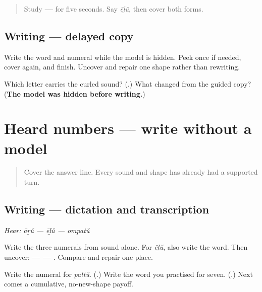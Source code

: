 \label{lesson:ML-W07-numbers-6-10-delayed-copy}



\begin{quote}
Study \textbf{ — } for five seconds. Say \emph{ēḻŭ}, then cover both forms.
\end{quote}

\subsection*{Writing — delayed copy}

Write the word and numeral while the model is hidden. Peek once if needed, cover again, and finish. Uncover and repair one shape rather than rewriting.

\begin{tcolorbox}[breakable,colback=teal!4,colframe=teal!35!black,title={Before you move on}]
Which letter carries the curled sound? (\textbf{}.) What changed from the guided copy? (\textbf{The model was hidden before writing.})
\end{tcolorbox}
\section[\texorpdfstring{\ml{ഏഴ്} \ml{൭} (ēḻŭ, seven)}{ഏഴ് ൭ (ēḻŭ, seven)}]{Heard numbers — write without a model}

\label{lesson:ML-W07-numbers-6-10-dictation}



\begin{quote}
Cover the answer line. Every sound and shape has already had a supported turn.
\end{quote}

\subsection*{Writing — dictation and transcription}
\emph{Hear:} \emph{āṟŭ — ēḻŭ — ompatŭ}

Write the three numerals from sound alone. For \emph{ēḻŭ}, also write the word. Then uncover: \textbf{ —   — }. Compare and repair one place.

\begin{tcolorbox}[breakable,colback=teal!4,colframe=teal!35!black,title={Before you move on}]
Write the numeral for \emph{pattŭ}. (\textbf{}.) Write the word you practised for seven. (\textbf{}.) Next comes a cumulative, no-new-shape payoff.
\end{tcolorbox}
